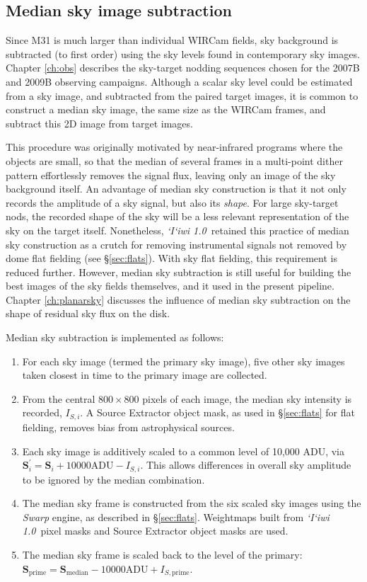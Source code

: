 \documentclass[iop]{emulateapj}
\newcommand{\vect}[1]{\boldsymbol{#1}} %
\newcommand{\sw}[1]{\textit{#1}} %
\newcommand{\iiwione}{\sw{`I`iwi 1.0}}
\begin{document}
\subsection{Median sky image subtraction} %
\label{sec:mediansky}

Since M31 is much larger than individual WIRCam fields, sky background is subtracted (to first order) using the sky levels found in contemporary sky images. Chapter \ref{ch:obs} describes the sky-target nodding sequences chosen for the 2007B and 2009B observing campaigns. Although a scalar sky level could be estimated from a sky image, and subtracted from the paired target images, it is common to construct a median sky image, the same size as the WIRCam frames, and subtract this 2D image from target images.

This procedure was originally motivated by near-infrared programs where the objects are small, so that the median of several frames in a multi-point dither pattern effortlessly removes the signal flux, leaving only an image of the sky background itself. An advantage of median sky construction is that it not only records the amplitude of a sky signal, but also its \emph{shape}. For large sky-target nods, the recorded shape of the sky will be a less relevant representation of the sky on the target itself. Nonetheless, \iiwione\ retained this practice of median sky construction as a crutch for removing instrumental signals not removed by dome flat fielding (see \S \ref{sec:flats}). With sky flat fielding, this requirement is reduced further. However, median sky subtraction is still useful for building the best images of the sky fields themselves, and it used in the present pipeline. Chapter \ref{ch:planarsky} discusses the influence of median sky subtraction on the shape of residual sky flux on the disk.

Median sky subtraction is implemented as follows:

\begin{enumerate}
	\item For each sky image (termed the primary sky image), five other sky images taken closest in time to the primary image are collected.
	\item From the central $800\times 800$ pixels of each image, the median sky intensity is recorded, $I_{S,i}$. A Source Extractor object mask, as used in \S \ref{sec:flats} for flat fielding, removes bias from astrophysical sources.
	\item Each sky image is additively scaled to a common level of 10,000 ADU, via $\vect{S}_i^\prime =\vect{S}_i + 10000\mathrm{ADU} - I_{S,i}$. This allows differences in overall sky amplitude to be ignored by the median combination.
	\item The median sky frame is constructed from the six scaled sky images using the \sw{Swarp} engine, as described in \S \ref{sec:flats}. Weightmaps built from \iiwione\ pixel masks and Source Extractor object masks are used.
	\item The median sky frame is scaled back to the level of the primary: $\vect{S}_\mathrm{prime} = \vect{S}_\mathrm{median} -10000\mathrm{ADU} + I_{S,\mathrm{prime}}$.
\end{enumerate}
\end{document}
